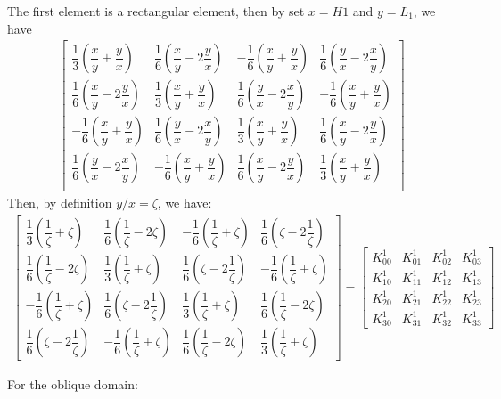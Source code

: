 \documentclass{book}
\begin{document}
The first element is a rectangular element, then by set $x = H1$ and $y = L_1$, we have
\begin{align*}
    \begin{bmatrix}
        \dfrac{1}{3} \left(\dfrac{x}{y} + \dfrac{y}{x}\right) & \dfrac{1}{6} \left(\dfrac{x}{y} - 2\dfrac{y}{x}\right) & -\dfrac{1}{6} \left(\dfrac{x}{y} + \dfrac{y}{x}\right) & \dfrac{1}{6} \left(\dfrac{y}{x} - 2\dfrac{x}{y}\right) \\
        \dfrac{1}{6} \left(\dfrac{x}{y} - 2\dfrac{y}{x}\right)  & \dfrac{1}{3} \left(\dfrac{x}{y} + \dfrac{y}{x}\right) & \dfrac{1}{6} \left(\dfrac{y}{x} - 2\dfrac{x}{y}\right) & -\dfrac{1}{6} \left(\dfrac{x}{y} + \dfrac{y}{x}\right) \\
        -\dfrac{1}{6} \left(\dfrac{x}{y} + \dfrac{y}{x}\right) & \dfrac{1}{6} \left(\dfrac{y}{x} - 2\dfrac{x}{y}\right) & \dfrac{1}{3} \left(\dfrac{x}{y} + \dfrac{y}{x}\right) & \dfrac{1}{6} \left(\dfrac{x}{y} - 2\dfrac{y}{x}\right)  \\
        \dfrac{1}{6} \left(\dfrac{y}{x} - 2\dfrac{x}{y}\right) & -\dfrac{1}{6} \left(\dfrac{x}{y} + \dfrac{y}{x}\right) & \dfrac{1}{6} \left(\dfrac{x}{y} - 2\dfrac{y}{x}\right) & \dfrac{1}{3} \left(\dfrac{x}{y} + \dfrac{y}{x}\right) \\
    \end{bmatrix}
\end{align*}
Then, by definition $y/x = \zeta$, we have:
\begin{align*}
    \begin{bmatrix}
        \dfrac{1}{3} \left(\dfrac{1}{\zeta} + \zeta\right) & \dfrac{1}{6} \left(\dfrac{1}{\zeta} - 2\zeta\right) & -\dfrac{1}{6} \left(\dfrac{1}{\zeta} + \zeta\right) & \dfrac{1}{6} \left(\zeta - 2\dfrac{1}{\zeta}\right) \\
        \dfrac{1}{6} \left(\dfrac{1}{\zeta} - 2\zeta\right)  & \dfrac{1}{3} \left(\dfrac{1}{\zeta} + \zeta\right) & \dfrac{1}{6} \left(\zeta - 2\dfrac{1}{\zeta}\right) & -\dfrac{1}{6} \left(\dfrac{1}{\zeta} + \zeta\right) \\
        -\dfrac{1}{6} \left(\dfrac{1}{\zeta} + \zeta\right) & \dfrac{1}{6} \left(\zeta - 2\dfrac{1}{\zeta}\right) & \dfrac{1}{3} \left(\dfrac{1}{\zeta} + \zeta\right) & \dfrac{1}{6} \left(\dfrac{1}{\zeta} - 2\zeta\right)  \\
        \dfrac{1}{6} \left(\zeta - 2\dfrac{1}{\zeta}\right) & -\dfrac{1}{6} \left(\dfrac{1}{\zeta} + \zeta\right) & \dfrac{1}{6} \left(\dfrac{1}{\zeta} - 2\zeta\right) & \dfrac{1}{3} \left(\dfrac{1}{\zeta} + \zeta\right)
    \end{bmatrix}
    =
    \begin{bmatrix}
        K_{00}^1 & K_{01}^1 & K_{02}^1 & K_{03}^1 \\
        K_{10}^1 & K_{11}^1 & K_{12}^1 & K_{13}^1 \\
        K_{20}^1 & K_{21}^1 & K_{22}^1 & K_{23}^1 \\
        K_{30}^1 & K_{31}^1 & K_{32}^1 & K_{33}^1
    \end{bmatrix}
\end{align*}

For the oblique domain:
\end{document}
